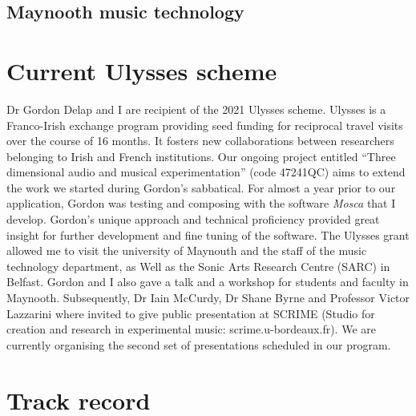 \documentclass[journal,onecolumn]{IEEEtran}
\begin{document}
\subsection{Maynooth music technology}

\section{Current Ulysses scheme} %
Dr Gordon Delap and I are recipient of the 2021 Ulysses scheme. Ulysses is a Franco-Irish exchange program providing seed funding for reciprocal travel visits over the course of 16 months. It fosters new collaborations between researchers belonging to Irish and French institutions. Our ongoing project entitled ``Three dimensional audio and musical experimentation'' (code 47241QC) aims to extend the work we started during Gordon's sabbatical. For almost a year prior to our application, Gordon was testing and composing with the software \textit{Mosca} \cite{mott:mosca} that I develop. Gordon's unique approach and technical proficiency provided great insight for further development and fine tuning of the software. The Ulysses grant allowed me to visit the university of Maynouth and the staff of the music technology department, as Well as the Sonic Arts Research Centre (SARC) in Belfast. Gordon and I also gave a talk and a workshop for students and faculty in Maynooth. Subsequently, Dr Iain McCurdy, Dr Shane Byrne and Professor Victor Lazzarini where invited to give public presentation at SCRIME (Studio for creation and research in experimental music: scrime.u-bordeaux.fr). We are currently organising the second set of presentations scheduled in our program.

\section{Track record}
\end{document}
